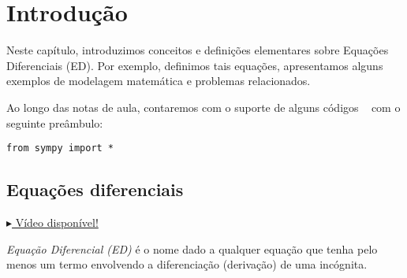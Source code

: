 
\chapter{Introdução}\label{cap_intro}
\thispagestyle{fancy}

Neste capítulo, introduzimos conceitos e definições elementares sobre Equações Diferenciais (ED). Por exemplo, definimos tais equações, apresentamos alguns exemplos de modelagem matemática e problemas relacionados.

\ifispython
\begin{obs}\label{obs:python}
Ao longo das notas de aula, contaremos com o suporte de alguns códigos \python~ com o seguinte preâmbulo:
\begin{verbatim}
from sympy import *
\end{verbatim}
\end{obs}
\fi


\section{Equações diferenciais}\label{cap_intro_sec_ed}

\begin{flushright}
  \href{https://archive.org/details/edo-introducao}{$\blacktriangleright$ Vídeo disponível!}
\end{flushright}

\emph{Equação Diferencial (ED)} é o nome dado a qualquer equação que tenha pelo menos um termo envolvendo a diferenciação (derivação) de uma incógnita.

